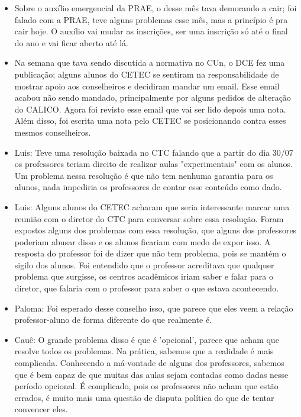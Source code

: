 \documentclass{ata-calico}
\begin{document}
\maketitle

\begin{itemize}
\item Sobre o auxílio emergencial da PRAE, o desse mês tava demorando a cair; foi falado com a PRAE, teve alguns problemas esse mês, mas a princípio é pra cair hoje. O auxílio vai mudar as inscrições, ser uma inscrição só até o final do ano e vai ficar aberto até lá.
\item Na semana que tava sendo discutida a normativa no CUn, o DCE fez uma publicação; alguns alunos do CETEC se sentiram na responsabilidade de mostrar apoio aos conselheiros e decidiram mandar um email. Esse email acabou não sendo mandado, principalmente por alguns pedidos de alteração do CALICO. Agora foi revisto esse email que vai ser lido depois uma nota. Além disso, foi escrita uma nota pelo CETEC se posicionando contra esses mesmos conselheiros.
\end{itemize}

\begin{itemize}
\item Luis: Teve uma resolução baixada no CTC falando que a partir do dia 30/07 os professores teriam direito de realizar aulas "experimentais" com os alunos. Um problema nessa resolução é que não tem nenhuma garantia para os alunos, nada impediria os professores de contar esse conteúdo como dado.
\item Luis: Alguns alunos do CETEC acharam que seria interessante marcar uma reunião com o diretor do CTC para conversar sobre essa resolução. Foram expostos alguns dos problemas com essa resolução, que alguns dos professores poderiam abusar disso e os alunos ficariam com medo de expor isso. A resposta do professor foi de dizer que não tem problema, pois se mantém o sigilo dos alunos. Foi entendido que o professor acreditava que qualquer problema que surgisse, os centros acadêmicos iriam saber e falar para o diretor, que falaria com o professor para saber o que estava acontecendo.
\item Paloma: Foi esperado desse conselho isso, que parece que eles veem a relação professor-aluno de forma diferente do que realmente é.
\item Cauê: O grande problema disso é que é 'opcional', parece que acham que resolve todos os problemas. Na prática, sabemos que a realidade é mais complicada. Conhecendo a má-vontade de alguns dos professores, sabemos que é bem capaz de que muitas das aulas sejam contadas como dadas nesse período opcional. É complicado, pois os professores não acham que estão errados, é muito mais uma questão de disputa política do que de tentar convencer eles.
\end{itemize}
\end{document}
